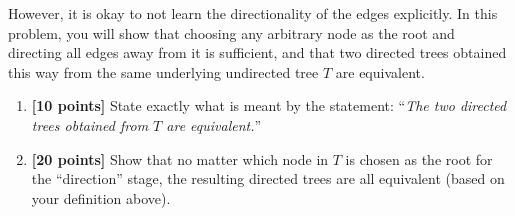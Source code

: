 \begin{enumerate}
      However, it is okay to not learn the directionality of the edges explicitly. In
      this problem, you will show that choosing any arbitrary node as the root
      and directing all edges away from it is sufficient, and that two directed
      trees obtained this way from the same underlying undirected tree $T$ are
      equivalent.

      \begin{enumerate}
        \item {\bf [10 points]}
          State exactly what is meant by the statement: ``\emph{The two directed trees
          obtained from $T$ are equivalent.}''

        \item {\bf [20 points]}
          Show that no matter which node in $T$ is chosen as the root for the
          ``direction'' stage, the resulting directed trees are all equivalent (based
          on your definition above).

      \end{enumerate}


\end{enumerate}

